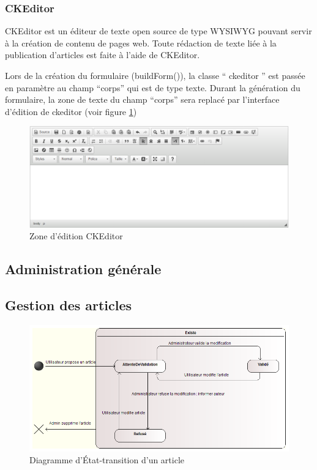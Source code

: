 \documentclass[a4paper,12pt, notitlepage]{report}
\begin{document}
\subsubsection{CKEditor}
CKEditor est un éditeur de texte open source de type \gls{WYSIWYG} pouvant servir à la création de contenu de pages web.
Toute rédaction de texte liée à la publication d’articles est faite à l’aide de CKEditor.

Lors de la création du formulaire (buildForm()), la classe “ ckeditor ” est passée en paramètre au champ “corps” qui est de type texte.
Durant la génération du formulaire, la zone de texte du champ “corps” sera replacé par l’interface d’édition de ckeditor (voir figure \ref{ckeditor})
\begin{figure} 
    \caption{Zone d'édition CKEditor}  
    \label{ckeditor}
    \centering
    \includegraphics[scale=0.5]{images/ckeditor.png}
\end{figure}
\subsection{Administration générale}
\subsection{Gestion des articles}
\begin{figure} 
    \caption{Diagramme d'État-transition d'un article}  
    \label{e-t-articles}
    \centering
    \includegraphics[scale=0.37]{images/DiagEtatTransitionEtatArticle.png}
\end{figure}
\end{document}
